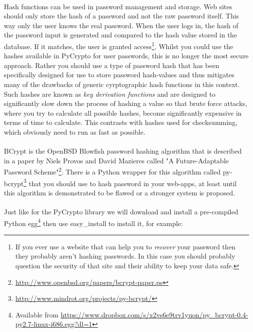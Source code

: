 \documentclass[12pt, a4paper, twoside]{book}
\begin{document}
\paragraph{} Hash functions can be used in password management and storage. Web sites should only store the hash of a password and not the raw password itself. This way only the user knows the real password. When the user logs in, the hash of the password input is generated and compared to the hash value stored in the database. If it matches, the user is granted access\footnote{If you ever use a website that can help you to \emph{recover} your password then they probably aren't hashing passwords. In this case you should probably question the security of that site and their ability to keep your data safe.}. Whilst you could use the hashes available in PyCrypto for user passwords, this is no longer the most secure approach. Rather you should use a type of password hash that has been specifically designed for use to store password hash-values and thus mitigates many of the drawbacks of generic cyrptographic hash functions in this context. Such hashes are known as \emph{key derivation functions} and are designed to significantly slow down the process of hashing a value so that brute force attacks, where you try to calculate all possible hashes, become significantly expensive in terms of time to calculate. This contrasts with hashes used for checksumming, which obviously need to run as fast as possible. 

\paragraph{} BCrypt is the OpenBSD Blowfish password hashing algorithm that is described in a paper by Niels Provos and David Mazieres called "A Future-Adaptable Password Scheme"\footnote{\url{http://www.openbsd.org/papers/bcrypt-paper.ps}}. There is a Python wrapper for this algorithm called py-bcrypt\footnote{\url{http://www.mindrot.org/projects/py-bcrypt/}} that you should use to hash password in your web-apps, at least until this algorithm is demonstrated to be flawed or a stronger system is proposed.

\paragraph{} Just like for the PyCrypto library we will download and install a pre-compiled Python egg\footnote{Available from \url{https://www.dropbox.com/s/x2vs6e9trv1yuon/py_bcrypt-0.4-py2.7-linux-i686.egg?dl=1}} then use easy\_install to install it, for example:
\end{document}
